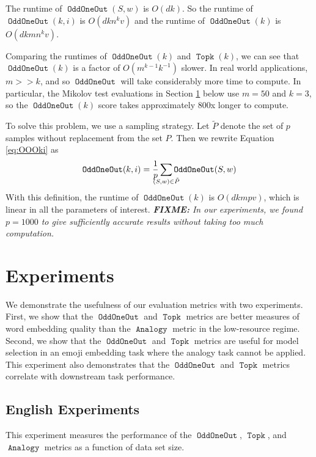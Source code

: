 \documentclass[11pt,a4paper]{article}
\DeclareMathOperator{\OddOneOut}{\texttt{OddOneOut}}
\DeclareMathOperator{\topk}{\texttt{Topk}}
\DeclareMathOperator{\analogy}{\texttt{Analogy}}
\newcommand{\fixme}[1]{{\color{red}\itshape \textbf{FIXME:} {#1}}}
\begin{document}
The runtime of $\OddOneOut(S,w)$ is $O(dk)$.
So the runtime of $\OddOneOut(k,i)$ is $O(dkn^kv)$ and the runtime of $\OddOneOut(k)$ is $O(dkmn^kv)$.

Comparing the runtimes of $\OddOneOut(k)$ and $\topk(k)$, we can see that $\OddOneOut(k)$ is a factor of $O(m^{k-1}k^{-1})$ slower.
In real world applications, $m >\!\!> k$, and so $\OddOneOut$ will take considerably more time to compute.
In particular, the Mikolov test evaluations in Section \ref{sec:experiments} below use $m=50$ and $k=3$,
so the $\OddOneOut(k)$ score takes approximately 800x longer to compute.

To solve this problem, we use a sampling strategy.
Let $\tilde P$ denote the set of $p$ samples without replacement from the set $P$.
Then we rewrite Equation \ref{eq:OOOki} as
\begin{equation}
    \OddOneOut(k,i) = \frac 1 p \sum_{\mathclap{(S,w) \in \tilde P}} \OddOneOut(S,w)
\end{equation}
With this definition, the runtime of $\OddOneOut(k)$ is $O(dkmpv)$,
which is linear in all the parameters of interest.
\fixme{In our experiments, we found $p=1000$ to give sufficiently accurate results without taking too much computation.}

\section{Experiments}
\label{sec:experiments}

We demonstrate the usefulness of our evaluation metrics with two experiments.
First, we show that the $\OddOneOut$ and $\topk$ metrics are better measures of word embedding quality than the $\analogy$ metric in the low-resource regime.
Second, we show that the $\OddOneOut$ and $\topk$ metrics are useful for model selection in an emoji embedding task where the analogy task cannot be applied.
This experiment also demonstrates that the $\OddOneOut$ and $\topk$ metrics correlate with downstream task performance.

\subsection{English Experiments}

This experiment measures the performance of the $\OddOneOut$, $\topk$, and $\analogy$ metrics as a function of data set size.

\end{document}
